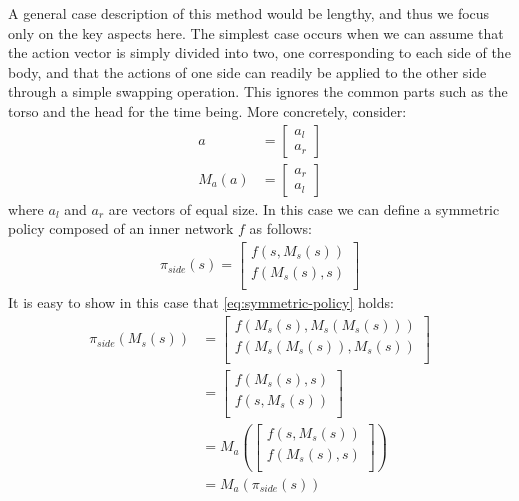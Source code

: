 A general case description of this method would be lengthy, and thus we focus only on the key aspects here. 
The simplest case occurs when we can assume that the action vector is simply divided 
into two, one corresponding to each side of the body, 
and that the actions of one side can readily be applied to the other side through a simple swapping operation.
This ignores the common parts such as the torso and the head for the time being.
More concretely, consider:
\begin{align*}
    a &= \begin{bmatrix}a_l\\a_r\end{bmatrix} \\
    M_a(a) &= \begin{bmatrix}a_r\\a_l\end{bmatrix}
\end{align*}
where $a_l$ and $a_r$ are vectors of equal size.
In this case we can define a symmetric policy composed of an inner network $f$ as follows:
\begin{align*}
    \pi_{side}(s) = \begin{bmatrix}
    f(s,M_s(s))\\
    f(M_s(s),s)\\
    \end{bmatrix}
\end{align*}
It is easy to show in this case that \autoref{eq:symmetric-policy} holds:
\begin{align*}
    \pi_{side}(M_s(s)) &= \begin{bmatrix}
    f(M_s(s),M_s(M_s(s)))\\
    f(M_s(M_s(s)),M_s(s))\\
    \end{bmatrix}\\
    &= \begin{bmatrix}
    f(M_s(s),s)\\
    f(s,M_s(s))\\
    \end{bmatrix}\\
    &= M_a\left( \begin{bmatrix}
    f(s,M_s(s))\\
    f(M_s(s),s)\\
    \end{bmatrix} \right)\\
    &= M_a\left(\pi_{side}(s)\right)
\end{align*}

